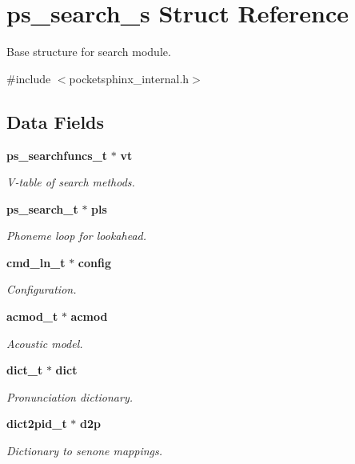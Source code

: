 \section{ps\-\_\-search\-\_\-s Struct Reference}
\label{structps__search__s}


Base structure for search module.  




{\ttfamily \#include $<$pocketsphinx\-\_\-internal.\-h$>$}

\subsection*{Data Fields}
\begin{DoxyCompactItemize}
\item 
{\bf ps\-\_\-searchfuncs\-\_\-t} $\ast$ {\bf vt}
\begin{DoxyCompactList}\small\item\em V-\/table of search methods. \end{DoxyCompactList}\item 
{\bf ps\-\_\-search\-\_\-t} $\ast$ {\bf pls}
\begin{DoxyCompactList}\small\item\em Phoneme loop for lookahead. \end{DoxyCompactList}\item 
{\bf cmd\-\_\-ln\-\_\-t} $\ast$ {\bf config}
\begin{DoxyCompactList}\small\item\em Configuration. \end{DoxyCompactList}\item 
{\bf acmod\-\_\-t} $\ast$ {\bf acmod}
\begin{DoxyCompactList}\small\item\em Acoustic model. \end{DoxyCompactList}\item 
{\bf dict\-\_\-t} $\ast$ {\bf dict}
\begin{DoxyCompactList}\small\item\em Pronunciation dictionary. \end{DoxyCompactList}\item 
{\bf dict2pid\-\_\-t} $\ast$ {\bf d2p}
\begin{DoxyCompactList}\small\item\em Dictionary to senone mappings. \end{DoxyCompactList}\item 

\end{DoxyCompactItemize}
